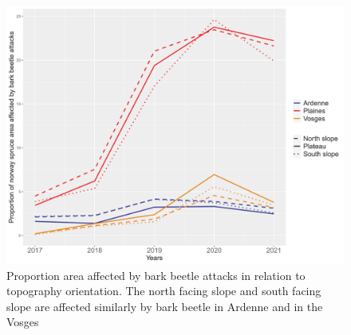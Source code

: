 \documentclass[3p,procedia]{elsarticle}
\begin{document}
\begin{figure}
\centering
	\includegraphics[width=\textwidth]{SS_ardenne_vosges_plaines.png}
    \caption{Proportion area affected by bark beetle attacks in relation to topography orientation. The north facing slope and south facing slope are affected similarly by bark beetle in Ardenne and in the Vosges}
	\label{ss_sco}
\end{figure}

	
\end{document}
